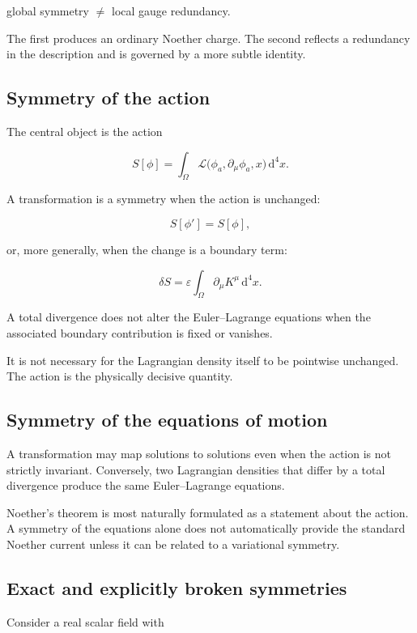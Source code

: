 \begin{center}
global symmetry \(\neq\) local gauge redundancy.
\end{center}

The first produces an ordinary Noether charge. The second reflects a redundancy in the description and is governed by a more subtle identity.

\subsection{Symmetry of the action}

The central object is the action

\[
S[\phi]
=
\int_{\Omega}
\mathcal{L}
\bigl(
\phi_a,
\partial_{\mu}\phi_a,
x
\bigr)
\,\mathrm{d}^{4}x.
\]

A transformation is a symmetry when the action is unchanged:

\[
S[\phi']
=
S[\phi],
\]

or, more generally, when the change is a boundary term:

\[
\delta S
=
\varepsilon
\int_{\Omega}
\partial_{\mu}K^{\mu}
\,\mathrm{d}^{4}x.
\]

A total divergence does not alter the Euler--Lagrange equations when the associated boundary contribution is fixed or vanishes.

It is not necessary for the Lagrangian density itself to be pointwise unchanged. The action is the physically decisive quantity.

\subsection{Symmetry of the equations of motion}

A transformation may map solutions to solutions even when the action is not strictly invariant. Conversely, two Lagrangian densities that differ by a total divergence produce the same Euler--Lagrange equations.

Noether's theorem is most naturally formulated as a statement about the action. A symmetry of the equations alone does not automatically provide the standard Noether current unless it can be related to a variational symmetry.

\subsection{Exact and explicitly broken symmetries}

Consider a real scalar field with

